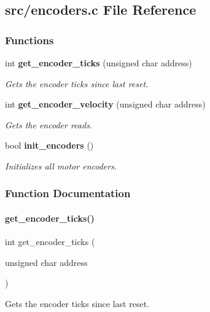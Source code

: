\subsection{src/encoders.c File Reference}
\label{encoders_8c}
\subsubsection*{Functions}
\begin{DoxyCompactItemize}
\item 
int \textbf{ get\+\_\+encoder\+\_\+ticks} (unsigned char address)
\begin{DoxyCompactList}\small\item\em Gets the encoder ticks since last reset. \end{DoxyCompactList}\item 
int \textbf{ get\+\_\+encoder\+\_\+velocity} (unsigned char address)
\begin{DoxyCompactList}\small\item\em Gets the encoder reads. \end{DoxyCompactList}\item 
bool \textbf{ init\+\_\+encoders} ()
\begin{DoxyCompactList}\small\item\em Initializes all motor encoders. \end{DoxyCompactList}\end{DoxyCompactItemize}


\subsubsection{Function Documentation}
\mbox{\label{encoders_8c_aed261dd4dae33a48c42f2e363c84760f}} 
\paragraph{get\+\_\+encoder\+\_\+ticks()}
{\footnotesize\ttfamily int get\+\_\+encoder\+\_\+ticks (\begin{DoxyParamCaption}\item[{unsigned char}]{address }\end{DoxyParamCaption})}



Gets the encoder ticks since last reset. 

